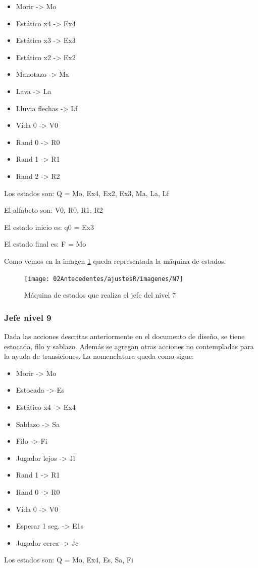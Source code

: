 \begin{itemize}
	\item Morir -> Mo
	\item Estático x4 -> Ex4
	\item Estático x3 -> Ex3
	\item Estático x2 -> Ex2
	\item Manotazo -> Ma
	\item Lava -> La
	\item Lluvia flechas -> Lf
	\item Vida 0 -> V0
	\item Rand 0 -> R0
	\item Rand 1 -> R1
	\item Rand 2 -> R2
\end{itemize}
Los estados son:
Q = {Mo, Ex4, Ex2, Ex3, Ma, La, Lf}

El alfabeto son:
 {V0, R0, R1, R2}

El estado inicio es:
q0 = {Ex3}

El estado final es:
F = {Mo}


Como vemos en la imagen \ref{fig:maqN7} queda representada la máquina de estados.

\begin{figure}
	\centering
	\caption{Máquina de estados que realiza el jefe del nivel 7}
	\label{fig:maqN7}
	\texttt{[image: 02Antecedentes/ajustesR/imagenes/N7]}
\end{figure}

\subsubsection{Jefe nivel 9}
Dada las acciones descritas anteriormente en el documento de diseño, se tiene estocada, filo y sablazo. Además se agregan otras acciones no contempladas para la ayuda de transiciones.
La nomenclatura queda como sigue:

\begin{itemize}
	\item Morir -> Mo
	\item Estocada -> Es
	\item Estático x4 -> Ex4 
	\item Sablazo -> Sa
	\item Filo -> Fi
	\item Jugador lejos -> Jl
	\item Rand 1 -> R1
	\item Rand 0 -> R0
	\item Vida 0 -> V0
	\item Esperar 1 seg. -> E1s
	\item Jugador cerca -> Jc
\end{itemize}
Los estados son:
Q = {Mo, Ex4, Es, Sa, Fi}

